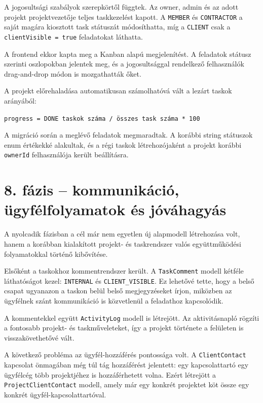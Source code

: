 \documentclass[11pt,a4paper]{report}
\begin{document}
    A jogosultsági szabályok szerepkörtől függtek. Az owner, admin és az adott
    projekt projektvezetője teljes taskkezelést kapott. A
    \texttt{MEMBER} és \texttt{CONTRACTOR} a saját magára kiosztott task
    státuszát módosíthatta, míg a \texttt{CLIENT} csak a
    \texttt{clientVisible = true} feladatokat láthatta.

    A frontend ekkor kapta meg a Kanban alapú megjelenítést. A feladatok státusz
    szerinti oszlopokban jelentek meg, és a jogosultsággal rendelkező felhasználók
    drag-and-drop módon is mozgathatták őket.

    A projekt előrehaladása automatikusan számolhatóvá vált a lezárt taskok
    arányából:

    \begin{center}
        \texttt{progress = DONE taskok száma / összes task száma * 100}
    \end{center}

    A migráció során a meglévő feladatok megmaradtak. A korábbi string státuszok
    enum értékekké alakultak, és a régi taskok létrehozójaként a projekt korábbi
    \texttt{ownerId} felhasználója került beállításra.

    \section{8. fázis -- kommunikáció, ügyfélfolyamatok és jóváhagyás}

    A nyolcadik fázisban a cél már nem egyetlen új alapmodell létrehozása volt,
    hanem a korábban kialakított projekt- és taskrendszer valós együttműködési
    folyamatokkal történő kibővítése.

    Elsőként a taskokhoz kommentrendszer került. A
    \texttt{TaskComment} modell kétféle láthatóságot kezel:
    \texttt{INTERNAL} és \texttt{CLIENT\_VISIBLE}. Ez lehetővé tette, hogy a
    belső csapat ugyanazon a taskon belül belső megjegyzéseket írjon, miközben az
    ügyfélnek szánt kommunikáció is közvetlenül a feladathoz kapcsolódik.

    A kommentekkel együtt \texttt{ActivityLog} modell is létrejött. Az
    aktivitásnapló rögzíti a fontosabb projekt- és taskműveleteket, így a projekt
    története a felületen is visszakövethetővé vált.

    A következő probléma az ügyfél-hozzáférés pontossága volt. A
    \texttt{ClientContact} kapcsolat önmagában még túl tág hozzáférést jelentett:
    egy kapcsolattartó egy ügyfélcég több projektjéhez is hozzáférhetett volna.
    Ezért létrejött a \texttt{ProjectClientContact} modell, amely már egy konkrét
    projektet köt össze egy konkrét ügyfél-kapcsolattartóval.
\end{document}
